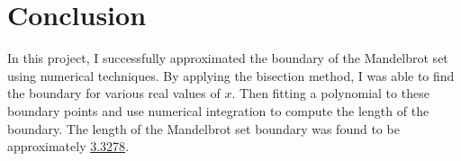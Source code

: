 \documentclass{article}
\begin{document}
\section{Conclusion}
In this project, I successfully approximated the boundary of the Mandelbrot set using numerical techniques. By applying the bisection method, I was able to find the boundary for various real values of \( x \). Then fitting a polynomial to these boundary points and use numerical integration to compute the length of the boundary. The length of the Mandelbrot set boundary was found to be approximately \underline{3.3278}.
\end{document}
